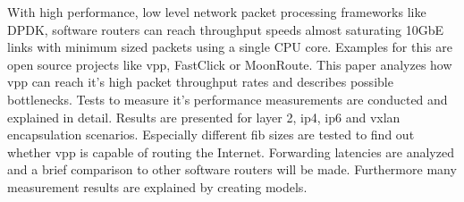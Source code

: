 \small

With high performance, low level network packet processing frameworks
like DPDK, software routers can reach throughput speeds almost
saturating 10GbE links with minimum sized packets using a single CPU
core. Examples for this are open source projects like \Ac{vpp},
FastClick or MoonRoute. This paper analyzes how \Ac{vpp} can reach
it's high packet throughput rates and describes possible bottlenecks.
Tests to measure it's performance measurements are conducted and
explained in detail. Results are presented for layer 2, \Ac{ip4},
\Ac{ip6} and \Ac{vxlan} encapsulation scenarios. Especially different
\Ac{fib} sizes are tested to find out whether \Ac{vpp} is capable of
routing the Internet. Forwarding latencies are analyzed and a brief
comparison to other software routers will be made. Furthermore many
measurement results are explained by creating models.

